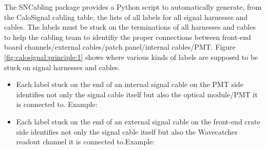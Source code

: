 The  SNCabling  package  provides  a Python  script  to  automatically
generate, from the  CaloSignal cabling table, the lists of  all labels for all
signal  harnesses  and  cables.   The  labels must  be  stuck  on  the
terminations of all  harnesses and cables to help the  cabling team to
identifiy   the    proper   connections   between    front-end   board
channels/external  cables/patch   panel/internal  cables/PMT.   Figure
\ref{fig:calosignal:principle:1} shows  where various kinds  of labels
are supposed to be stuck on signal harnesses and cables.

\begin{itemize}
\item Each label  stuck on the end of an  internal signal cable on
  the PMT  side identifies  not only  the signal cable  itself but  also the
  optical module/PMT it is connected to. Example:
  \begin{center}
  \end{center}
\item Each label  stuck on the end of an  external signal cable on
  the front-end crate  side identifies  not only  the signal cable  itself but  also the
  Wavecatcher readout channel it is connected to.Example:
  \begin{center}
  \end{center}
\end{itemize}

